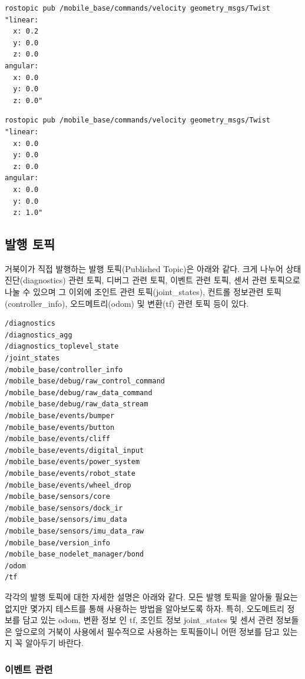 \vspace{\baselineskip}
\begin{lstlisting}[language=ROS]
rostopic pub /mobile_base/commands/velocity geometry_msgs/Twist "linear:
  x: 0.2
  y: 0.0
  z: 0.0
angular:
  x: 0.0
  y: 0.0
  z: 0.0"
\end{lstlisting}

\begin{lstlisting}[language=ROS]
rostopic pub /mobile_base/commands/velocity geometry_msgs/Twist "linear:
  x: 0.0
  y: 0.0
  z: 0.0
angular:
  x: 0.0
  y: 0.0
  z: 1.0"
\end{lstlisting}

\subsection{발행 토픽}

거북이가 직접 발행하는 발행 토픽(Published Topic)은 아래와 같다. 크게 나누어 상태 진단(diagnostics) 관련 토픽, 디버그 관련 토픽, 이벤트 관련 토픽, 센서 관련 토픽으로 나눌 수 있으며 그 이외에 조인트 관련 토픽(joint\_states), 컨트롤 정보관련 토픽(controller\_info), 오드메트리(odom) 및 변환(tf) 관련 토픽 등이 있다.

\begin{lstlisting}[language=ROS]
/diagnostics
/diagnostics_agg
/diagnostics_toplevel_state
/joint_states
/mobile_base/controller_info
/mobile_base/debug/raw_control_command
/mobile_base/debug/raw_data_command
/mobile_base/debug/raw_data_stream
/mobile_base/events/bumper
/mobile_base/events/button
/mobile_base/events/cliff
/mobile_base/events/digital_input
/mobile_base/events/power_system
/mobile_base/events/robot_state
/mobile_base/events/wheel_drop
/mobile_base/sensors/core
/mobile_base/sensors/dock_ir
/mobile_base/sensors/imu_data
/mobile_base/sensors/imu_data_raw
/mobile_base/version_info
/mobile_base_nodelet_manager/bond
/odom
/tf
\end{lstlisting}

각각의 발행 토픽에 대한 자세한 설명은 아래와 같다. 모든 발행 토픽을 알아둘 필요는 없지만 몇가지 테스트를 통해 사용하는 방법을 알아보도록 하자. 특히, 오도메트리 정보를 담고 있는 odom, 변환 정보 인 tf, 조인트 정보 joint\_states 및 센서 관련 정보들은 앞으로의 거북이 사용에서 필수적으로 사용하는 토픽들이니 어떤 정보를 담고 있는지 꼭 알아두기 바란다.

\subsubsection{이벤트 관련}

